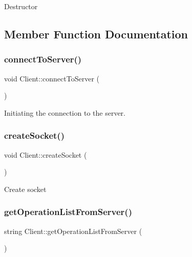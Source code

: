 Destructor 

\subsection{Member Function Documentation}
\mbox{\label{classClient_a484b660517d6a610b6733bee7e96cb8c}} 
\subsubsection{\texorpdfstring{connect\+To\+Server()}{connectToServer()}}
{\footnotesize\ttfamily void Client\+::connect\+To\+Server (\begin{DoxyParamCaption}{ }\end{DoxyParamCaption})\hspace{0.3cm}{\ttfamily [private]}}

Initiating the connection to the server. \mbox{\label{classClient_a76e843ac6155814b72b5b07d50c0d42e}} 
\subsubsection{\texorpdfstring{create\+Socket()}{createSocket()}}
{\footnotesize\ttfamily void Client\+::create\+Socket (\begin{DoxyParamCaption}{ }\end{DoxyParamCaption})\hspace{0.3cm}{\ttfamily [private]}}

Create socket \mbox{\label{classClient_af0e814ffbcec066870a0f9d06aab1c80}} 
\subsubsection{\texorpdfstring{get\+Operation\+List\+From\+Server()}{getOperationListFromServer()}}
{\footnotesize\ttfamily string Client\+::get\+Operation\+List\+From\+Server (\begin{DoxyParamCaption}{ }\end{DoxyParamCaption})}

